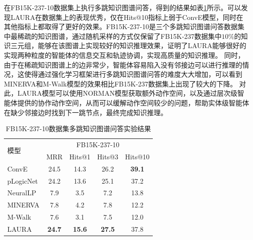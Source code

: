 \documentclass[algorithmlist, AutoFakeBold, AutoFakeSlant, figurelist, tablelist, nomlist, engineering]{seuthesix}
\begin{document}
在FB15K-237-10数据集上执行多跳知识图谱问答，得到的结果如表\ref{Experiment2_FB15K-237-10}所示。可以发现LAURA在数据集上的表现优秀，仅在Hits@10指标上弱于ConvE模型，同时在其他指标上都取得了更好的效果。FB15K-237-10是三个多跳知识图谱问答数据集中最稀疏的知识图谱，通过随机采样的方式仅保留了FB15K-237数据集中$10\%$的知识三元组，能够在该图谱上实现较好的知识推理效果，证明了LAURA能够很好的实现两种粒度的智能体的信息交互和轨迹协调，实现高质量的知识推理。
同时，由于在稀疏知识图谱上的边非常少，智能体容易陷入没有邻接边可以进行推理的情况，这使得通过强化学习框架进行多跳知识图谱问答的难度大大增加，可以看到MINERVA和M-Walk模型的效果相比FB15K-237数据集上出现了较大的下降。
对此，LAURA模型可以使用NORMAN模型获取额外动作空间，以及通过层次级智能体提供的协作动作空间，从而可以缓解动作空间较少的问题，帮助实体级智能体在缺少邻接边时找到下一跳节点，最终完成知识推理。
\begin{table}[]
  \centering
  \begin{tabular*}{0.95\textwidth}{@{\extracolsep{\fill}}lcccc}
  \toprule[1pt]
  \multirow{2}{*}{模型} & \multicolumn{4}{c}{FB15K-237-10}   \\
    & MRR & Hits@1 & Hits@3 & Hits@10 \\ \hline
  ConvE & 24.5 & 14.3 & 26.2 & \textbf{39.1} \\
  pLogicNet & 24.2 & 13.6 & 25.1 & 37.2 \\
  NeuralLP & 7.9 & 3.5 & 7.2 & 13.8 \\
  MINERVA & 7.8 & 4.2 & 7.8 & 12.2 \\
  M-Walk & 7.6 & 3.1 & 7.5 & 12.0 \\
  LAURA & \textbf{24.7} & \textbf{15.6} & \textbf{27.5} & 37.8 \\
  \bottomrule[1pt]
  \end{tabular*}
  \caption{FB15K-237-10数据集多跳知识图谱问答实验结果}
  \label{Experiment2_FB15K-237-10}
\end{table}
\end{document}
